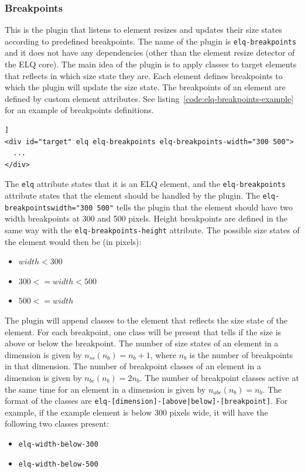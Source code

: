 \documentclass[a4paper,11pt]{kth-mag}
\newcommand{\code}[1]{\texttt{#1}}
\newcommand\abbr[2][]{\uppercase{#2}\ifthenelse{\equal{#1}{}}%
                     {}{#1}}
\begin{document}
          \subsubsection{Breakpoints}
            This is the plugin that listens to element resizes and updates their size states according to predefined breakpoints.
            The name of the plugin is \code{elq-breakpoints} and it does not have any dependencies (other than the element resize detector of the \abbr{elq} core).
            The main idea of the plugin is to apply classes to target elements that reflects in which size state they are.
            Each element defines breakpoints to which the plugin will update the size state.
            The breakpoints of an element are defined by custom element attributes.
            See listing~\ref{code:elq-breakpoints-example} for an example of breakpoints definitions.
            \begin{lstlisting}[caption={Example an \gls{HTML} element that uses the \code{elq-breakpoints} plugin.},captionpos=b,label={code:elq-breakpoints-example}]]
<div id="target" elq elq-breakpoints elq-breakpoints-width="300 500">
  ...
</div>
            \end{lstlisting}
            The \code{elq} attribute states that it is an \abbr{elq} element, and the \code{elq-breakpoints} attribute states that the element should be handled by the plugin.
            The \code{elq-breakpoints\-width="300 500"} tells the plugin that the element should have two width breakpoints at 300 and 500 pixels.
            Height breakpoints are defined in the same way with the \code{elq-breakpoints-height} attribute.
            The possible size states of the element would then be (in pixels):
            \begin{itemize}
              \item $width < 300$
              \item $300 <= width < 500$
              \item $500 <= width$
            \end{itemize}
            The plugin will append classes to the element that reflects the size state of the element.
            For each breakpoint, one class will be present that tells if the size is above or below the breakpoint.
            The number of size states of an element in a dimension is given by $n_{ss}(n_b) = n_b + 1$, where $n_b$ is the number of breakpoints in that dimension.
            The number of breakpoint classes of an element in a dimension is given by $n_{bc}(n_{b}) = 2n_b$.
            The number of breakpoint classes active at the same time for an element in a dimension is given by $n_{abc}(n_{b}) = n_{b}$.
            The format of the classes are \code{elq-[dimension]-[above|below]-[breakpoint]}.
            For example, if the example element is below 300 pixels wide, it will have the following two classes present:
            \begin{itemize}
              \item \code{elq-width-below-300}
              \item \code{elq-width-below-500}
            \end{itemize}
\end{document}
